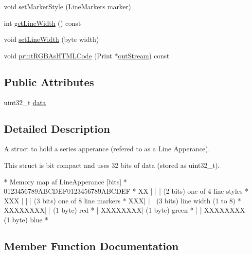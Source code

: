 \begin{DoxyCompactItemize}
\item 
void \hyperlink{struct_line_apperance_aa15cf71fa2fb087a2391abb01bcd320b}{set\+Marker\+Style} (\hyperlink{_line_apperance_8h_a68bf945a0195e285b96ed51e814a6286}{Line\+Markers} marker)
\item 
int \hyperlink{struct_line_apperance_af185f4756f8fe8991551f615ddac1ba7}{get\+Line\+Width} () const 
\item 
void \hyperlink{struct_line_apperance_a310d71b2ebb02f5d44c23e2048fc8d48}{set\+Line\+Width} (byte width)
\item 
void \hyperlink{struct_line_apperance_a1370d300e9531998490e59c98082097d}{print\+R\+G\+B\+As\+H\+T\+M\+L\+Code} (Print $\ast$\hyperlink{_w_d_arduino_lib___unit_tests_8h_a1cfeea12527296318184b8fafd28ff4e}{out\+Stream}) const 
\end{DoxyCompactItemize}
\subsection*{Public Attributes}
\begin{DoxyCompactItemize}
\item 
uint32\+\_\+t \hyperlink{struct_line_apperance_a0c6239c22f699f072e4d50ef3469718f}{data}
\end{DoxyCompactItemize}


\subsection{Detailed Description}
A struct to hold a series apperance (refered to as a Line Apperance).

This struct is bit compact and uses 32 bits of data (stored as uint32\+\_\+t).

\begin{DoxyVerb}* Memory map af LineApperance [bits]
* 0123456789ABCDEF0123456789ABCDEF  
* XX      |       |       |         (2 bits) one of 4 line styles
*   XXX   |       |       |         (3 bits) one of 8 line markers
*      XXX|       |       |         (3 bits) line width (1 to 8)
*         XXXXXXXX|       |         (1 byte) red
*         |       XXXXXXXX|         (1 byte) green
*         |       |       XXXXXXXX  (1 byte) blue
* \end{DoxyVerb}
 

\subsection{Member Function Documentation}
\hypertarget{struct_line_apperance_a7af927b62d49e1731f324f22b438634c}{}
